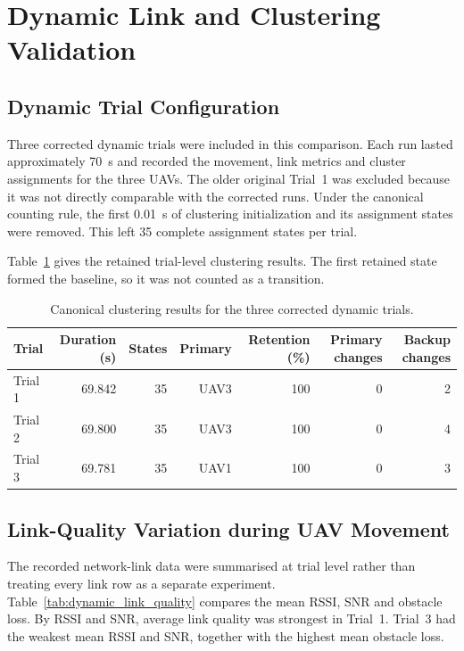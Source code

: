 \section{Dynamic Link and Clustering Validation}
\label{sec:dynamic_link_clustering_validation}

\subsection{Dynamic Trial Configuration}

Three corrected dynamic trials were included in this comparison. Each run lasted approximately 70~s and recorded the movement, link metrics and cluster assignments for the three UAVs. The older original Trial~1 was excluded because it was not directly comparable with the corrected runs. Under the canonical counting rule, the first 0.01~s of clustering initialization and its assignment states were removed. This left 35 complete assignment states per trial.

Table~\ref{tab:dynamic_trial_summary} gives the retained trial-level clustering results. The first retained state formed the baseline, so it was not counted as a transition.

\begin{table}[htbp]
    \centering
    \small
    \caption{Canonical clustering results for the three corrected dynamic trials.}
    \label{tab:dynamic_trial_summary}
    \begin{tabular}{lrrrrrr}
        \toprule
        Trial & Duration (s) & States & Primary & Retention (\%) & Primary changes & Backup changes \\
        \midrule
        Trial 1 & 69.842 & 35 & UAV3 & 100 & 0 & 2 \\
        Trial 2 & 69.800 & 35 & UAV3 & 100 & 0 & 4 \\
        Trial 3 & 69.781 & 35 & UAV1 & 100 & 0 & 3 \\
        \bottomrule
    \end{tabular}
\end{table}

\subsection{Link-Quality Variation during UAV Movement}

The recorded network-link data were summarised at trial level rather than treating every link row as a separate experiment. Table~\ref{tab:dynamic_link_quality} compares the mean RSSI, SNR and obstacle loss. By RSSI and SNR, average link quality was strongest in Trial~1. Trial~3 had the weakest mean RSSI and SNR, together with the highest mean obstacle loss.

